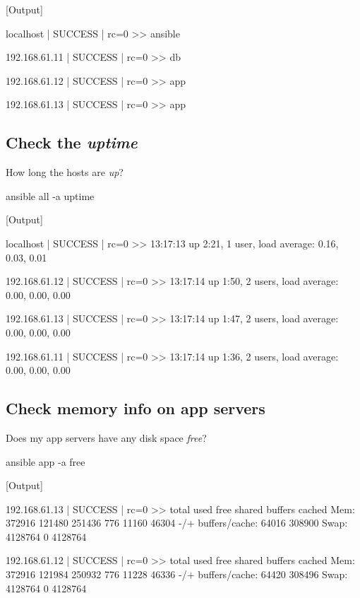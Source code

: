[Output]\newline
\begin{code}
localhost | SUCCESS | rc=0 >>
ansible

192.168.61.11 | SUCCESS | rc=0 >>
db

192.168.61.12 | SUCCESS | rc=0 >>
app

192.168.61.13 | SUCCESS | rc=0 >>
app
\end{code}

\subsection{Check the \emph{uptime}}

How long the hosts are \emph{up}?

\begin{code}
ansible all -a uptime
\end{code}

[Output]\newline
\begin{code}
localhost | SUCCESS | rc=0 >>
 13:17:13 up  2:21,  1 user,  load average: 0.16, 0.03, 0.01

192.168.61.12 | SUCCESS | rc=0 >>
 13:17:14 up  1:50,  2 users,  load average: 0.00, 0.00, 0.00

192.168.61.13 | SUCCESS | rc=0 >>
 13:17:14 up  1:47,  2 users,  load average: 0.00, 0.00, 0.00

192.168.61.11 | SUCCESS | rc=0 >>
 13:17:14 up  1:36,  2 users,  load average: 0.00, 0.00, 0.00
\end{code}

\subsection{Check memory info on app servers}

Does my app servers have any disk space \emph{free}?

\begin{code}
ansible app -a free
\end{code}

[Output]\newline
\begin{code}
192.168.61.13 | SUCCESS | rc=0 >>
             total       used       free     shared    buffers     cached
Mem:        372916     121480     251436        776      11160      46304
-/+ buffers/cache:      64016     308900
Swap:      4128764          0    4128764

192.168.61.12 | SUCCESS | rc=0 >>
             total       used       free     shared    buffers     cached
Mem:        372916     121984     250932        776      11228      46336
-/+ buffers/cache:      64420     308496
Swap:      4128764          0    4128764
\end{code}

